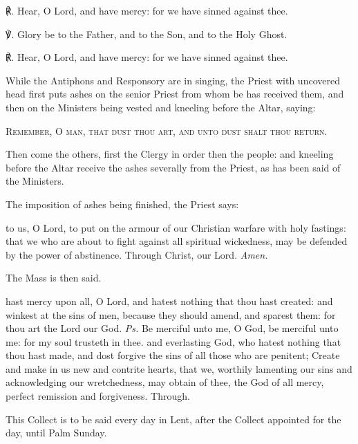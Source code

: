 ℟. Hear, O Lord, and have mercy: for we have sinned against thee.\par
℣. Glory be to the Father, and to the Son, and to the Holy Ghost.\par
℟. Hear, O Lord, and have mercy: for we have sinned against thee.\par
\begin{rubric}
    While the Antiphons and Responsory are in singing, the Priest with uncovered head first puts ashes on the senior Priest from whom be has received them, and then on the Ministers being vested and kneeling before the Altar, saying:
\end{rubric}
\begin{center}
    \textsc{Remember, O man, that dust thou art, and unto dust shalt thou return.}
\end{center}
\begin{rubric}
    Then come the others, first the Clergy in order then the people: and kneeling before the Altar receive the ashes severally from the Priest, as has been said of the Ministers.
\end{rubric}
\begin{rubric}
    The imposition of ashes being finished, the Priest says:
\end{rubric}
{} to us, O Lord, to put on the armour of our Christian warfare with holy fastings: that we who are about to fight against all spiritual wickedness, may be defended by the power of abstinence. Through Christ, our Lord. \textit{Amen.}
\begin{rubric}
    The Mass is then said.
\end{rubric}
\introit\label{AshWednesdayMass}
 hast mercy upon all, O Lord, and hatest nothing that thou hast created: and winkest at the sins of men, because they should amend, and sparest them: for thou art the Lord our God. \textit{Ps.} Be merciful unto me, O God, be merciful unto me: for my soul trusteth in thee.
\collect
{} and everlasting God, who hatest nothing that thou hast made, and dost forgive the sins of all those who are penitent; Create and make in us new and contrite hearts, that we, worthily lamenting our sins and acknowledging our wretchedness, may obtain of thee, the God of all mercy, perfect remission and forgiveness. Through.
\begin{rubric}
This Collect is to be said every day in Lent, after the Collect appointed for the day, until Palm Sunday.
\end{rubric}

